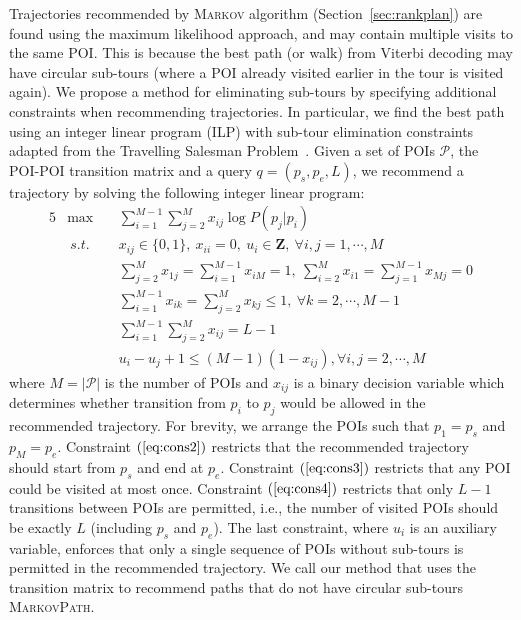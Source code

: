 Trajectories recommended by \textsc{Markov} algorithm (Section~\ref{sec:rankplan}) are found
using the maximum likelihood approach, and may contain multiple visits to the same POI.
This is because the best path (or walk) from Viterbi decoding %
may have 
circular sub-tours (where a POI already visited earlier in the tour is visited again).
We propose a method for eliminating sub-tours by specifying additional constraints when recommending trajectories.
%
In particular, we find the best path using an integer linear program (ILP) with
sub-tour elimination constraints adapted from the Travelling Salesman Problem~\cite{opt98}.
Given a set of POIs $\mathcal{P}$, the POI-POI transition matrix and a query $q = (p_s, p_e, L)$,
we recommend a trajectory by solving the following integer linear program:
\begin{alignat}{5}
& \max  ~&& \sum_{i=1}^{M-1} \sum_{j=2}^M x_{ij} \log P(p_j | p_i)                                                 \nonumber \\
& ~s.t. ~&& x_{ij} \in \{0, 1\}, ~x_{ii} = 0, ~u_i \in \mathbf{Z}, ~\forall i, j = 1, \cdots, M                    \label{eq:cons1} \\
&        && \sum_{j=2}^M x_{1j} = \sum_{i=1}^{M-1} x_{iM} = 1, ~\sum_{i=2}^M x_{i1} = \sum_{j=1}^{M-1} x_{Mj} = 0  \label{eq:cons2} \\
&        && \sum_{i=1}^{M-1} x_{ik} = \sum_{j=2}^M x_{kj} \le 1,   ~\forall k=2, \cdots, M-1                       \label{eq:cons3} \\
&        && \sum_{i=1}^{M-1} \sum_{j=2}^M x_{ij} = L-1                                                             \label{eq:cons4} \\
&        && u_i - u_j + 1 \le (M-1) (1-x_{ij}),                     \forall i, j = 2, \cdots, M                    \label{eq:cons5}
\end{alignat}
where $M=|\mathcal{P}|$ is the number of POIs and $x_{ij}$ is a binary decision variable 
which determines whether transition from $p_i$ to $p_j$ would be allowed in the recommended trajectory.
For brevity, we arrange the POIs such that $p_1 = p_s$ and $p_M = p_e$.
Constraint $(\ref{eq:cons2})$ restricts that %
the recommended trajectory should start from $p_s$ and end at $p_e$.
Constraint $(\ref{eq:cons3})$ restricts that any POI could be visited at most once.
Constraint $(\ref{eq:cons4})$ restricts that only $L-1$ transitions between POIs are permitted, 
i.e., the number of visited POIs should be exactly $L$ (including $p_s$ and $p_e$).
The last constraint, where $u_i$ is an auxiliary variable, 
enforces that only a single sequence of POIs without sub-tours is permitted in the recommended trajectory.
We call our method that uses the transition matrix to recommend paths that do not have circular sub-tours \textsc{MarkovPath}.


